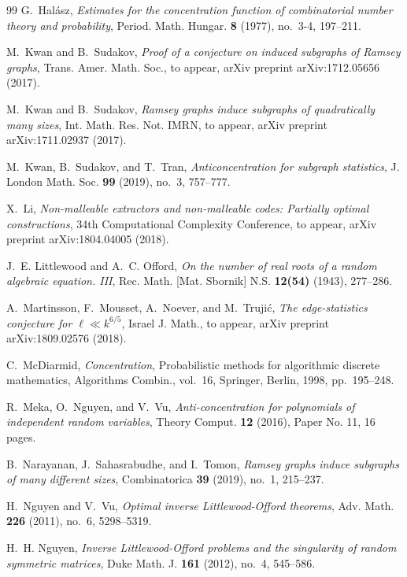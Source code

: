 \documentclass{daj}
\theoremstyle{plain}
\theoremstyle{plain}
\theoremstyle{plain}
\theoremstyle{plain}
\theoremstyle{definition}
\theoremstyle{plain}
\theoremstyle{plain}
\theoremstyle{definition}
\theoremstyle{definition}
\theoremstyle{plain}
\begin{document}
\begin{thebibliography}{99}
G.~Hal\'{a}sz, \emph{Estimates for the concentration function of combinatorial
  number theory and probability}, Period. Math. Hungar. \textbf{8} (1977),
  no.~3-4, 197--211.

M.~Kwan and B.~Sudakov, \emph{Proof of a conjecture on induced subgraphs of
  {R}amsey graphs}, Trans. Amer. Math. Soc., to appear, arXiv preprint
  arXiv:1712.05656 (2017).

M.~Kwan and B.~Sudakov, \emph{Ramsey graphs induce subgraphs of quadratically
  many sizes}, Int. Math. Res. Not. IMRN, to appear, arXiv preprint
  arXiv:1711.02937 (2017).

M.~Kwan, B.~Sudakov, and T.~Tran, \emph{Anticoncentration for subgraph
  statistics}, J. London Math. Soc. \textbf{99} (2019), no.~3, 757--777.

X.~Li, \emph{Non-malleable extractors and non-malleable codes: Partially
  optimal constructions}, 34th {C}omputational {C}omplexity {C}onference, to
  appear, arXiv preprint arXiv:1804.04005 (2018).

J.~E. Littlewood and A.~C. Offord, \emph{On the number of real roots of a
  random algebraic equation. {III}}, Rec. Math. [Mat. Sbornik] N.S.
  \textbf{12(54)} (1943), 277--286.

A.~Martinsson, F.~Mousset, A.~Noever, and M.~Truji{\'c}, \emph{The
  edge-statistics conjecture for $\ell \ll k^{6/5}$}, Israel J. Math., to
  appear, arXiv preprint arXiv:1809.02576 (2018).

C.~McDiarmid, \emph{Concentration}, Probabilistic methods for algorithmic
  discrete mathematics, Algorithms Combin., vol.~16, Springer, Berlin, 1998,
  pp.~195--248.

R.~Meka, O.~Nguyen, and V.~Vu, \emph{Anti-concentration for polynomials of
  independent random variables}, Theory Comput. \textbf{12} (2016), Paper No.
  11, 16 pages.

B.~Narayanan, J.~Sahasrabudhe, and I.~Tomon, \emph{Ramsey graphs induce
  subgraphs of many different sizes}, Combinatorica \textbf{39} (2019), no.~1,
  215--237.

H.~Nguyen and V.~Vu, \emph{Optimal inverse {L}ittlewood-{O}fford theorems},
  Adv. Math. \textbf{226} (2011), no.~6, 5298--5319.

H.~H. Nguyen, \emph{Inverse {L}ittlewood-{O}fford problems and the singularity
  of random symmetric matrices}, Duke Math. J. \textbf{161} (2012), no.~4,
  545--586.


\end{thebibliography}
\end{document}
